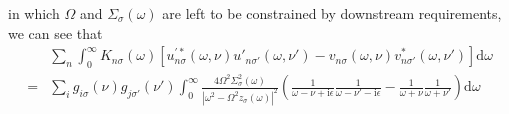 in which $\Omega$ and $\Sigma_\sigma(\omega)$ are left to be constrained by downstream requirements, we can see that
\begin{equation}
\begin{split}
&\sum_n\int_0^\infty K_{n\sigma}(\omega)\left[u_{n\sigma}^{\prime*}(\omega,\nu)u'_{n\sigma'}(\omega,\nu') - v_{n\sigma}(\omega,\nu)v_{n\sigma'}^*(\omega,\nu')\right]\mathrm{d}\omega\\
= &\sum_ig_{i\sigma}(\nu)g_{j\sigma'}(\nu')\int_0^\infty\frac{4\Omega^2\Sigma_\sigma^2(\omega)}{|\omega^2 - \Omega^2z_\sigma(\omega)|^2}\left(\frac{1}{\omega - \nu  + \mathrm{i}\epsilon}\frac{1}{\omega - \nu' - \mathrm{i}\epsilon} - \frac{1}{\omega + \nu }\frac{1}{\omega + \nu'}\right)\mathrm{d}\omega\\

\end{split}
\end{equation}
